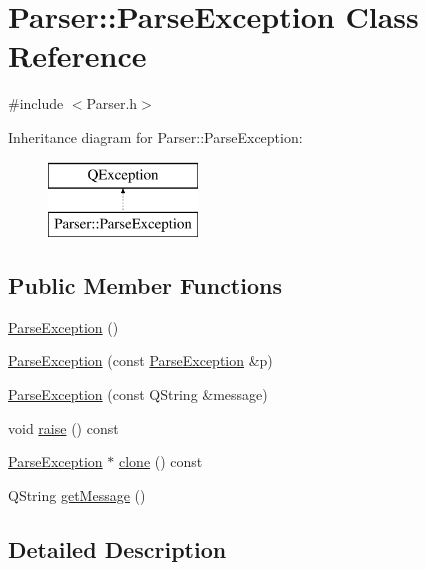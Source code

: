 \hypertarget{class_parser_1_1_parse_exception}{}\section{Parser\+:\+:Parse\+Exception Class Reference}
\label{class_parser_1_1_parse_exception}


{\ttfamily \#include $<$Parser.\+h$>$}

Inheritance diagram for Parser\+:\+:Parse\+Exception\+:\begin{figure}[H]
\begin{center}
\leavevmode
\includegraphics[height=2.000000cm]{class_parser_1_1_parse_exception}
\end{center}
\end{figure}
\subsection*{Public Member Functions}
\begin{DoxyCompactItemize}
\item 
\hyperlink{class_parser_1_1_parse_exception_ab7fd5c1b7820953c3e08601aaa1a9f19}{Parse\+Exception} ()
\item 
\hyperlink{class_parser_1_1_parse_exception_a74b82a3ce238db8400cd9cf7dbfa59bb}{Parse\+Exception} (const \hyperlink{class_parser_1_1_parse_exception}{Parse\+Exception} \&p)
\item 
\hyperlink{class_parser_1_1_parse_exception_a86f3e7a206b7c023df000c3eebdab758}{Parse\+Exception} (const Q\+String \&message)
\item 
void \hyperlink{class_parser_1_1_parse_exception_a0e0a14442e15e345a43f97614e6e02a5}{raise} () const
\item 
\hyperlink{class_parser_1_1_parse_exception}{Parse\+Exception} $\ast$ \hyperlink{class_parser_1_1_parse_exception_aa3c6a6636cc6b8c0a9bf82fc2e62eb11}{clone} () const
\item 
Q\+String \hyperlink{class_parser_1_1_parse_exception_af63b64e46a792b0692f5b5650697cf07}{get\+Message} ()
\end{DoxyCompactItemize}


\subsection{Detailed Description}


